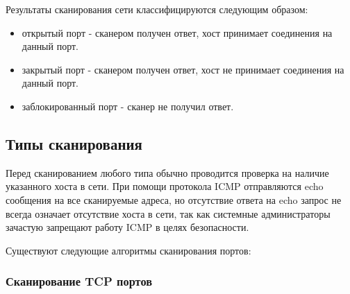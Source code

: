 Результаты сканирования сети классифицируются следующим образом:

\begin{itemize}
\item
  открытый порт - сканером получен ответ, хост принимает соединения на
  данный порт.
\item
  закрытый порт - сканером получен ответ, хост не принимает соединения
  на данный порт.
\item
  заблокированный порт - сканер не получил ответ.
\end{itemize}

\hypertarget{ux442ux438ux43fux44b-ux441ux43aux430ux43dux438ux440ux43eux432ux430ux43dux438ux44f}{%
\subsection{Типы
сканирования}\label{ux442ux438ux43fux44b-ux441ux43aux430ux43dux438ux440ux43eux432ux430ux43dux438ux44f}}

Перед сканированием любого типа обычно проводится проверка на наличие
указанного хоста в сети. При помощи протокола ICMP отправляются echo
сообщения на все сканируемые адреса, но отсутствие ответа на echo запрос
не всегда означает отсутствие хоста в сети, так как системные
администраторы зачастую запрещают работу ICMP в целях безопасности.

Существуют следующие алгоритмы сканирования портов:

\hypertarget{ux441ux43aux430ux43dux438ux440ux43eux432ux430ux43dux438ux435-tcp-ux43fux43eux440ux442ux43eux432}{%
\subsubsection{Сканирование TCP
портов}\label{ux441ux43aux430ux43dux438ux440ux43eux432ux430ux43dux438ux435-tcp-ux43fux43eux440ux442ux43eux432}}

